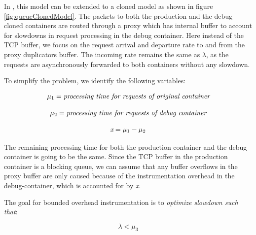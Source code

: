 In \parikshan, this model can be extended to a cloned model as shown in figure \ref{fig:queueClonedModel}.
The packets to both the production and the debug cloned containers are routed through a proxy which has internal buffer to account for slowdowns in request processing in the debug container. 
Here instead of the TCP buffer, we focus on the request arrival and departure rate to and from the proxy duplicators buffer.
The incoming rate remains the same as $\lambda$, as the requests are asynchronously forwarded to both containers without any slowdown. 

To simplify the problem, we identify the following variables:

\begin{equation}\label{eq:1}
\mu_{1} = \emph{processing time for requests of original container}
\end{equation}


\begin{equation}\label{eq:2}
\mu_{2} = \emph{processing time for requests of debug container}
\end{equation}

\begin{equation}\label{eq:3}
\emph{x} = \mu_{1} - \mu_{2}
\end{equation}

The remaining processing time for both the production container and the debug container is going to be the same. 
Since the TCP buffer in the production container is a blocking queue, we can assume that any buffer overflows in the proxy buffer are only caused because of the instrumentation overhead in the debug-container, which is accounted for by \emph{x}.

The goal for bounded overhead instrumentation is to \emph{optimize slowdown such that}:

\begin{equation}\label{eq:4}
 \lambda < \mu_{3}
\end{equation}


